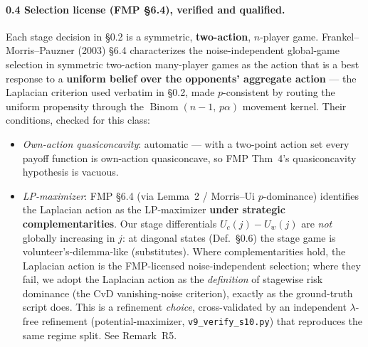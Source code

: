 \paragraph{0.4 Selection license (FMP \S 6.4), verified and qualified.}
Each stage decision in \S 0.2 is a symmetric, \textbf{two-action}, $n$-player game. Frankel--Morris--Pauzner (2003) \S 6.4 characterizes the noise-independent global-game selection in symmetric two-action many-player games as the action that is a best response to a \textbf{uniform belief over the opponents' aggregate action} --- the Laplacian criterion used verbatim in \S 0.2, made $p$-consistent by routing the uniform propensity through the $\operatorname{Binom}(n-1,\, p\alpha)$ movement kernel. Their conditions, checked for this class:
\begin{itemize}
\item \emph{Own-action quasiconcavity}: automatic --- with a two-point action set every payoff function is own-action quasiconcave, so FMP Thm~4's quasiconcavity hypothesis is vacuous.
\item \emph{LP-maximizer}: FMP \S 6.4 (via Lemma~2 / Morris--Ui $p$-dominance) identifies the Laplacian action as the LP-maximizer \textbf{under strategic complementarities}. Our stage differentials $U_c(j) - U_w(j)$ are \emph{not} globally increasing in $j$: at diagonal states (Def.\ \S 0.6) the stage game is volunteer's-dilemma-like (substitutes). Where complementarities hold, the Laplacian action is the FMP-licensed noise-independent selection; where they fail, we adopt the Laplacian action as the \emph{definition} of stagewise risk dominance (the CvD vanishing-noise criterion), exactly as the ground-truth script does. This is a refinement \emph{choice}, cross-validated by an independent $\lambda$-free refinement (potential-maximizer, \texttt{v9\_verify\_s10.py}) that reproduces the same regime split. See Remark~R5.
\end{itemize}

